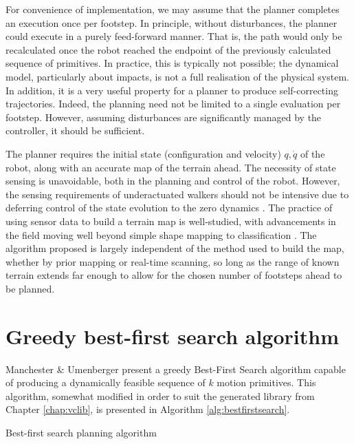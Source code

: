 For convenience of implementation, we may assume that the planner completes an execution once per footstep. In principle, without disturbances, the planner could execute in a purely feed-forward manner. That is, the path would only be recalculated once the robot reached the endpoint of the previously calculated sequence of primitives. In practice, this is typically not possible; the dynamical model, particularly about impacts, is not a full realisation of the physical system. In addition, it is a very useful property for a planner to produce self-correcting trajectories. Indeed, the planning need not be limited to a single evaluation per footstep. However, assuming disturbances are significantly managed by the controller, it should be sufficient.

The planner requires the initial state (configuration and velocity) $q,\dot{q}$ of the robot, along with an accurate map of the terrain ahead. The necessity of state sensing is unavoidable, both in the planning and control of the robot. However, the sensing requirements of underactuated walkers should not be intensive due to deferring control of the state evolution to the zero dynamics \cite{collins2005efficient}. The practice of using sensor data to build a terrain map is well-studied, with advancements in the field moving well beyond simple shape mapping to classification \cite{herbert1989terrain, triebel2006multi, brooks2007self}. The algorithm proposed is largely independent of the method used to build the map, whether by prior mapping or real-time scanning, so long as the range of known terrain extends far enough to allow for the chosen number of footsteps ahead to be planned.

\section{Greedy best-first search algorithm}
Manchester \& Umenberger \cite{manchester13planning} present a greedy Best-First Search algorithm capable of producing a dynamically feasible sequence of $k$ motion primitives. This algorithm, somewhat modified in order to suit the generated library from Chapter \ref{chap:vclib}, is presented in Algorithm \ref{alg:bestfirstsearch}.

\begin{algorithm}
	\begin{algorithmic}[1]
		\EndFunction
		\EndFunction
	\end{algorithmic}
	\caption{Best-first search planning algorithm}
	\label{alg:bestfirstsearch}
\end{algorithm}

